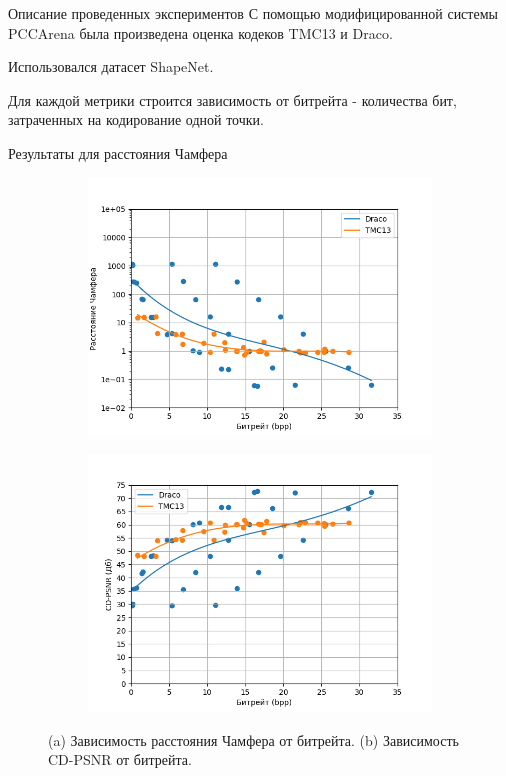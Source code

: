 \documentclass[aspectratio=169]{beamer}
\begin{document}
  \begin{frame}{Описание проведенных экспериментов}
    С помощью модифицированной системы PCCArena была произведена оценка кодеков
    TMC13 и Draco.

    Использовался датасет ShapeNet.

    Для каждой метрики строится зависимость от битрейта - количества бит,
    затраченных на кодирование одной точки.
  \end{frame}

  \begin{frame}{Результаты для расстояния Чамфера}
    \begin{figure}[H]
        \centering
        \begin{subfigure}{0.49\textwidth}
            \includegraphics[width=\linewidth]{assets/approx_cd_p2pt.png}
            \caption{}
        \end{subfigure}
        \begin{subfigure}{0.49\textwidth}
            \includegraphics[width=\linewidth]{assets/approx_cdpsnr_p2pt.png}
            \caption{}
        \end{subfigure}
        \caption{ (a) Зависимость расстояния Чамфера от битрейта. (b) Зависимость
        CD-PSNR от битрейта. }
        \label{img:pcc_arena_cd_bpp}
    \end{figure}
  \end{frame}
\end{document}
